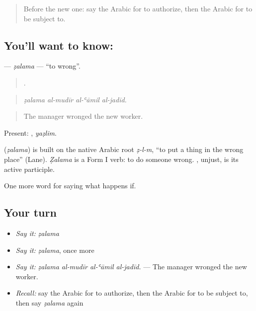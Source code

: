 \label{lesson:AR-C411-zalama}



\begin{quote}
Before the new one: say the Arabic for to authorize, then the Arabic for to be subject to.
\end{quote}

\subsection*{You'll want to know: }
\textbf{} — \emph{ẓalama} — \textquotedblleft{}to wrong\textquotedblright{}.

\begin{quote}
   .
\end{quote}

\begin{quote}
\emph{ẓalama al-mudīr al-ʿāmil al-jadīd.}
\end{quote}

\begin{quote}
The manager wronged the new worker.
\end{quote}

Present: , \emph{yaẓlim}.

\begin{cousinweb}
\textbf{} (\emph{ẓalama}) is built on the native Arabic root \emph{ẓ-l-m}, \textquotedblleft{}to put a thing in the wrong place\textquotedblright{} (Lane). \emph{Ẓalama} is a Form I verb: to do someone wrong. , unjust, is its active participle.
\end{cousinweb}

\begin{grammarlens}[title={What you've built}]
One more word for saying what happens if.
\end{grammarlens}

\subsection*{Your turn}
\begin{itemize}
\raggedright
  \item \emph{Say it:} \emph{ẓalama}
  \item \emph{Say it:} \emph{ẓalama}, once more
  \item \emph{Say it:} \emph{ẓalama al-mudīr al-ʿāmil al-jadīd.} — The manager wronged the new worker.
  \item \emph{Recall:} say the Arabic for to authorize, then the Arabic for to be subject to, then say \emph{ẓalama} again
\end{itemize}

